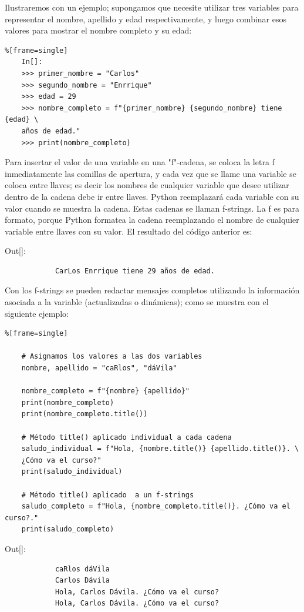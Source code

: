Ilustraremos con un ejemplo; supongamos que necesite utilizar tres variables para representar el nombre, 
apellido y  edad respectivamente, y luego combinar esos valores para mostrar el nombre completo y su edad:

\begin{lstlisting}%[frame=single]
	In[]:
	>>> primer_nombre = "Carlos"
	>>> segundo_nombre = "Enrrique"
	>>> edad = 29
	>>> nombre_completo = f"{primer_nombre} {segundo_nombre} tiene {edad} \
	años de edad."
	>>> print(nombre_completo)
\end{lstlisting}

Para insertar el valor de una variable en una {\ttfamily {}"{}f{}"{}}-cadena, se coloca la letra {\ttfamily f}   inmediatamente
las comillas de apertura, y cada vez que se llame una variable se coloca entre llaves; es decir los nombres de cualquier variable que desee utilizar dentro de la cadena debe ir entre llaves.  Python reemplazará cada variable con su valor cuando se muestra la cadena. Estas cadenas se llaman {\ttfamily f-strings}. La {\ttfamily f} es para formato, porque Python formatea la cadena reemplazando el nombre de cualquier variable entre llaves con su valor. El resultado del código anterior es:\\

{\ttfamily\scriptsize\scriptsize 
	\hspace{-0.65cm}Out[]:\vspace{-0.15cm}	
	{\color{blue} 	
		\begin{verbatim}		
			CarLos Enrrique tiene 29 años de edad.
		\end{verbatim}
}}


Con los {\ttfamily f-strings} se pueden redactar mensajes completos utilizando la información asociada a la variable (actualizadas o dinámicas); como se muestra con el siguiente ejemplo:


\hspace{-2.35cm}{\ttfamily \scriptsize ejemplo.py}\vspace{-0.5cm}
\begin{lstlisting}%[frame=single]
	
	# Asignamos los valores a las dos variables	
	nombre, apellido = "caRlos", "dáVila"
	
	nombre_completo = f"{nombre} {apellido}"
	print(nombre_completo)
	print(nombre_completo.title())
	
	# Método title() aplicado individual a cada cadena
	saludo_individual = f"Hola, {nombre.title()} {apellido.title()}. \
	¿Cómo va el curso?"
	print(saludo_individual)
	
	# Método title() aplicado  a un f-strings
	saludo_completo = f"Hola, {nombre_completo.title()}. ¿Cómo va el curso?."
	print(saludo_completo)
\end{lstlisting}
{\ttfamily\scriptsize\noindent Out[]:\vspace{-0.25cm}	
	{\color{blue} 	
		\begin{verbatim}		
			caRlos dáVila
			Carlos Dávila
			Hola, Carlos Dávila. ¿Cómo va el curso?
			Hola, Carlos Dávila. ¿Cómo va el curso?
		\end{verbatim}
}}






